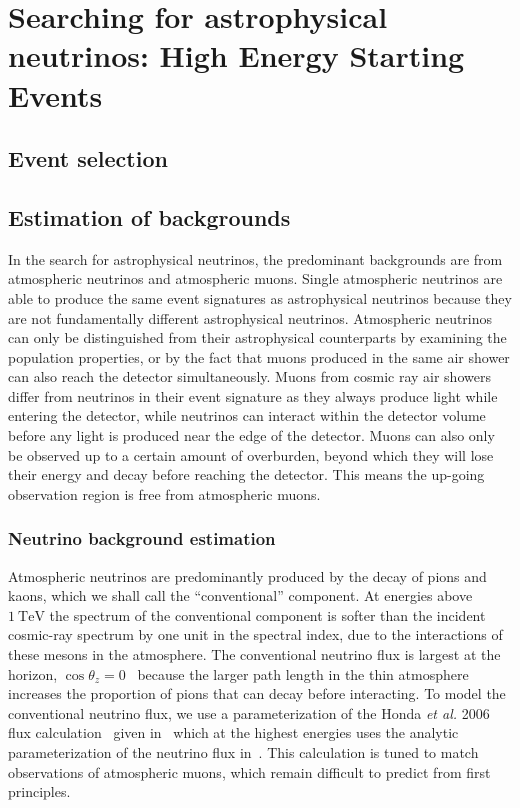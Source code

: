 \chapter{Searching for astrophysical neutrinos: High Energy Starting Events}

\section{Event selection\label{sec:selection}}
\begingroup
\graphicspath{{results/HESE_Final_Paper/}}

\endgroup

\section{Estimation of backgrounds}

In the search for astrophysical neutrinos, the predominant backgrounds are from atmospheric neutrinos and atmospheric muons.
Single atmospheric neutrinos are able to produce the same event signatures as astrophysical neutrinos because they are not fundamentally different astrophysical neutrinos.
Atmospheric neutrinos can only be distinguished from their astrophysical counterparts by examining the population properties, or by the fact that muons produced in the same air shower can also reach the detector simultaneously.
Muons from cosmic ray air showers differ from neutrinos in their event signature as they always produce light while entering the detector, while neutrinos can interact within the detector volume before any light is produced near the edge of the detector.
Muons can also only be observed up to a certain amount of overburden, beyond which they will lose their energy and decay before reaching the detector.
This means the up-going observation region is free from atmospheric muons.

\subsection{Neutrino background estimation}

Atmospheric neutrinos are predominantly produced by the decay of pions and kaons, which we shall call the ``conventional'' component.
At energies above $\SI{1}\TeV$ the spectrum of the conventional component is softer than the incident cosmic-ray spectrum by one unit in the spectral index, due to the interactions of these mesons in the atmosphere.
The conventional neutrino flux is largest at the horizon, $\cos\theta_z=0$~\cite{Gaisser:2002jj,Barr:2004br,Honda:2006qj,Petrova:2012qf} because the larger path length in the thin atmosphere increases the proportion of pions that can decay before interacting.
To model the conventional neutrino flux, we use a parameterization of the Honda {\it{}et al.} 2006 flux calculation~\cite{Honda:2006qj} given in~\cite{Montaruli:2011as} which at the highest energies uses the analytic parameterization of the neutrino flux in~\cite{Gaisser:2002jj}.
This calculation is tuned to match observations of atmospheric muons, which remain difficult to predict from first principles.

